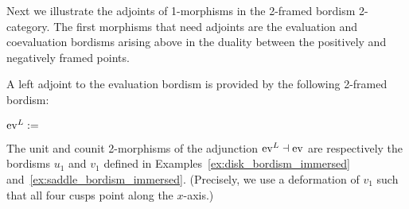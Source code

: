 \documentclass{amsart}
\begin{document}
Next we illustrate the adjoints of 1-morphisms in the 2-framed bordism 2-category.  The first morphisms that need adjoints are the evaluation and coevaluation bordisms arising above in the duality between the positively and negatively framed points.

\begin{example} \label{eg:evlevadj}
A left adjoint to the evaluation bordism is provided by the following 2-framed bordism:
\begin{center}
	$\mathrm{ev}^L := $ 
\end{center}
The unit and counit 2-morphisms of the adjunction $\mathrm{ev}^L \dashv \mathrm{ev}$ are respectively the bordisms $u_1$ and $v_1$ defined in Examples~\ref{ex:disk_bordism_immersed} and~\ref{ex:saddle_bordism_immersed}.  (Precisely, we use a deformation of $v_1$ such that all four cusps point along the $x$-axis.)
\end{example}
\end{document}
